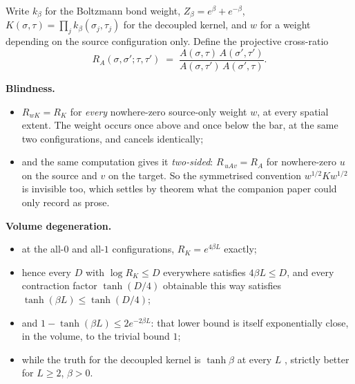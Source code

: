 \documentclass[11pt]{article}
\theoremstyle{definition}
\begin{document}
Write $k_\beta$ for the Boltzmann bond weight, $Z_\beta = e^\beta + e^{-\beta}$,
$K(\sigma,\tau)=\prod_j k_\beta(\sigma_j,\tau_j)$ for the decoupled kernel, and
$w$ for a weight depending on the source configuration only.  Define the
projective cross-ratio
\[
  R_A(\sigma,\sigma';\tau,\tau') \;=\;
  \frac{A(\sigma,\tau)\,A(\sigma',\tau')}{A(\sigma,\tau')\,A(\sigma',\tau)} .
\]

\medskip
\noindent\textbf{Blindness.}
\begin{itemize}
\item $R_{wK} = R_K$ for \emph{every} nowhere-zero source-only weight $w$, at
      every spatial extent.  The weight occurs once above and once below the
      bar, at the same two configurations, and cancels identically;
\item and the same computation gives it \emph{two-sided}:
      $R_{\,uAv}=R_A$ for nowhere-zero $u$ on the source and $v$ on the target.
      So the symmetrised convention $w^{1/2}Kw^{1/2}$ is invisible too, which
      settles by theorem what the companion paper could only record as prose.
\end{itemize}

\medskip
\noindent\textbf{Volume degeneration.}
\begin{itemize}
\item at the all-$0$ and all-$1$ configurations, $R_K = e^{4\beta L}$ exactly;
\item hence every $D$ with $\log R_K \le D$ everywhere satisfies $4\beta L \le
      D$, and every contraction factor $\tanh(D/4)$ obtainable this way
      satisfies $\tanh(\beta L)\le \tanh(D/4)$;
\item and $1-\tanh(\beta L)\le 2e^{-2\beta L}$: that lower bound is itself
      exponentially close, in the volume, to the trivial bound $1$;
\item while the truth for the decoupled kernel is $\tanh\beta$ at every $L$
      \cite{ErikssonSpatial}, strictly better for $L\ge2$, $\beta>0$.
\end{itemize}
\end{document}
